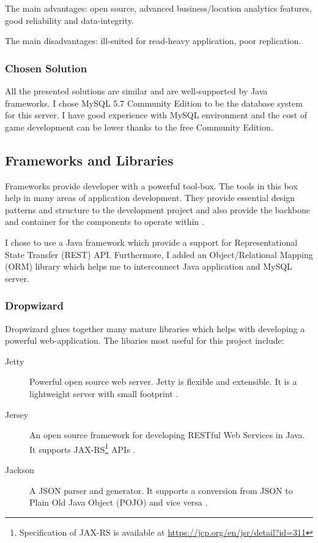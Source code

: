 		The main advantages: open source, advanced business/location analytics features, good reliability and data-integrity.
		
		The main disadvantages: ill-suited for read-heavy application, poor replication.
				
		\subsubsection*{Chosen Solution}
		All the presented solutions are similar and are well-supported by Java frameworks. I chose MySQL 5.7 Community Edition to be the database system for this server. I have good experience with MySQL environment and the cost of game development can be lower thanks to the free Community Edition. 
		
	\subsection{Frameworks and Libraries}
	Frameworks provide developer with a powerful tool-box. The tools in this box help in many areas of application development. They provide essential design patterns and structure to the development project and also provide the backbone and container for the components to operate within \cite{frameworks}.
	
	I chose to use a Java framework which provide a support for Representational State Transfer (REST) API. Furthermore, I added an Object/Relational Mapping (ORM) library which helps me to interconnect Java application and MySQL server.
	
		\subsubsection*{Dropwizard}
		Dropwizard \cite{dropwizard} glues together many mature libraries which helps with developing a powerful web-application. The libaries most useful for this project include:
		\begin{description}
			\item[Jetty] Powerful open source web server. Jetty is flexible and extensible. It is a lightweight server with small footprint \cite{jetty}.
			\item[Jersey] An open source framework for developing RESTful Web Services in Java. It supports JAX-RS\footnote{Specification of JAX-RS is available at \url{https://jcp.org/en/jsr/detail?id=311}} APIs \cite{jersey}.
			\item[Jackson] A JSON parser and generator. It supports a conversion from JSON to Plain Old Java Object (POJO) and vice versa \cite{jackson}.			
		\end{description}
			
